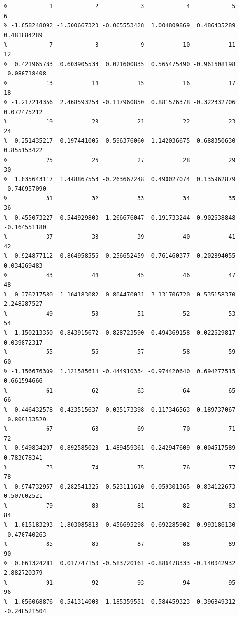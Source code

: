 \documentclass[
]{article}
\begin{document}
\begin{verbatim}
%            1            2            3            4            5            6 
% -1.058248092 -1.500667320 -0.065553428  1.004809869  0.486435289  0.481884289 
%            7            8            9           10           11           12 
%  0.421965733  0.603905533  0.021600835  0.565475490 -0.961608198 -0.080718408 
%           13           14           15           16           17           18 
% -1.217214356  2.468593253 -0.117960850  0.881576378 -0.322332706  0.072475212 
%           19           20           21           22           23           24 
%  0.251435217 -0.197441006 -0.596376060 -1.142036675 -0.688350630  0.855153422 
%           25           26           27           28           29           30 
%  1.035643117  1.448867553 -0.263667248  0.490027074  0.135962879 -0.746957090 
%           31           32           33           34           35           36 
% -0.455073227 -0.544929803 -1.266676047 -0.191733244 -0.902638848 -0.164551180 
%           37           38           39           40           41           42 
%  0.924877112  0.864958556  0.256652459  0.761460377 -0.202894055  0.034269483 
%           43           44           45           46           47           48 
% -0.276217580 -1.104183082 -0.804470031 -3.131706720 -0.535158370  2.248287527 
%           49           50           51           52           53           54 
%  1.150213350  0.843915672  0.828723590  0.494369158  0.022629817  0.039872317 
%           55           56           57           58           59           60 
% -1.156676309  1.121585614 -0.444910334 -0.974420640  0.694277515  0.661594666 
%           61           62           63           64           65           66 
%  0.446432578 -0.423515637  0.035173398 -0.117346563 -0.189737067 -0.809133529 
%           67           68           69           70           71           72 
%  0.949834207 -0.892585020 -1.489459361 -0.242947609  0.004517589  0.783678341 
%           73           74           75           76           77           78 
%  0.974732957  0.282541326  0.523111610 -0.059301365 -0.834122673  0.507602521 
%           79           80           81           82           83           84 
%  1.015183293 -1.803085818  0.456695298  0.692285902  0.993186130 -0.470740263 
%           85           86           87           88           89           90 
%  0.061324281  0.017747150 -0.583720161 -0.886478333 -0.140042932  2.882720379 
%           91           92           93           94           95           96 
%  1.056068876  0.541314008 -1.185359551 -0.584459323 -0.396849312 -0.248521504 

\end{verbatim}
\end{document}
